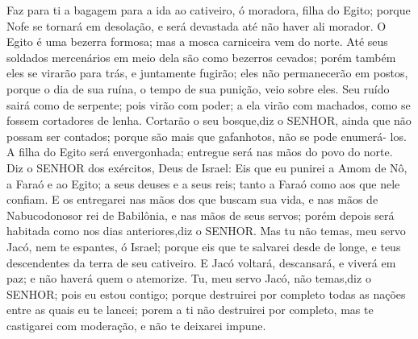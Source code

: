{Faz para ti a bagagem para a ida ao cativeiro, ó moradora, filha do Egito; porque Nofe se tornará em desolação, e será devastada até não haver ali morador.
O Egito é uma bezerra formosa; mas a mosca carniceira vem do norte.
Até seus soldados mercenários em meio dela são como bezerros cevados; porém também eles se virarão para trás, e juntamente fugirão; eles não permanecerão em postos, porque o dia de sua ruína, o tempo de sua punição, veio sobre eles.
Seu ruído sairá como de serpente; pois
{} virão com poder; a ela virão com machados, como se fossem cortadores de lenha.
Cortarão o seu bosque,diz o SENHOR, ainda que não possam ser contados; porque são mais que gafanhotos, não se pode enumerá- los.
A filha do Egito será envergonhada; entregue será nas mãos do povo do norte.
Diz o SENHOR dos exércitos, Deus de Israel: Eis que eu punirei a Amom de Nô,
 a Faraó e ao Egito; a seus deuses e a seus reis; tanto a Faraó como aos que nele confiam.
E os entregarei nas mãos dos que buscam
{} sua vida,
 e nas mãos de Nabucodonosor rei de Babilônia, e nas mãos de seus servos; porém depois será habitada como nos dias anteriores,diz o SENHOR.
Mas tu não temas, meu servo Jacó, nem te espantes, ó Israel; porque eis que te salvarei desde
{} de longe, e teus descendentes
 da terra de seu cativeiro. E Jacó voltará, descansará, e viverá em paz; e não haverá quem o atemorize.
Tu, meu servo Jacó, não temas,diz o SENHOR; pois eu estou contigo; porque destruirei por completo todas as nações entre as quais eu te lancei; porem a ti não destruirei por completo, mas te castigarei com moderação, e não te deixarei impune.

\par }


